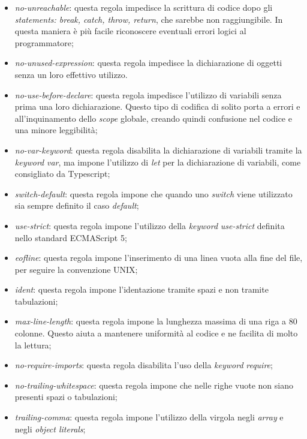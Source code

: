\begin{itemize}
                \item \textit{no-unreachable}: questa regola impedisce la scrittura di codice dopo gli \textit{statements: break, catch, throw, return}, che sarebbe non raggiungibile. In questa maniera \`e pi\`u facile riconoscere eventuali errori logici al programmatore;
                \item \textit{no-unused-expression}: questa regola impedisce la dichiarazione di oggetti senza un loro effettivo utilizzo. 
                \item \textit{no-use-before-declare}: questa regola impedisce l'utilizzo di variabili senza prima una loro dichiarazione. Questo tipo di codifica di solito porta a errori e all'inquinamento dello \textit{scope} globale, creando quindi confusione nel codice e una minore leggibilit\`a;
                \item \textit{no-var-keyword}: questa regola disabilita la dichiarazione di variabili tramite la \textit{keyword} \textit{var}, ma impone l'utilizzo di \textit{let} per la dichiarazione di variabili, come consigliato da Typescript;
                \item \textit{switch-default}: questa regola impone che quando uno \textit{switch} viene utilizzato sia sempre definito il caso \textit{default};
                \item \textit{use-strict}: questa regola impone l'utilizzo della \textit{keyword} \textit{use-strict} definita nello standard ECMAScript 5;
                \item \textit{eofline}: questa regola impone l'inserimento di una linea vuota alla fine del file, per seguire la convenzione UNIX;
                \item \textit{ident}: questa regola impone l'identazione tramite spazi e non tramite tabulazioni;
                \item \textit{max-line-length}: questa regola impone la lunghezza massima di una riga a 80 colonne. Questo aiuta a mantenere uniformit\`a al codice e ne facilita di molto la lettura;
                \item \textit{no-require-imports}: questa regola disabilita l'uso della \textit{keyword} \textit{require};
                \item \textit{no-trailing-whitespace}: questa regola impone che nelle righe vuote non siano presenti spazi o tabulazioni;
                \item \textit{trailing-comma}: questa regola impone l'utilizzo della virgola negli \textit{array} e negli \textit{object literals};

\end{itemize}
